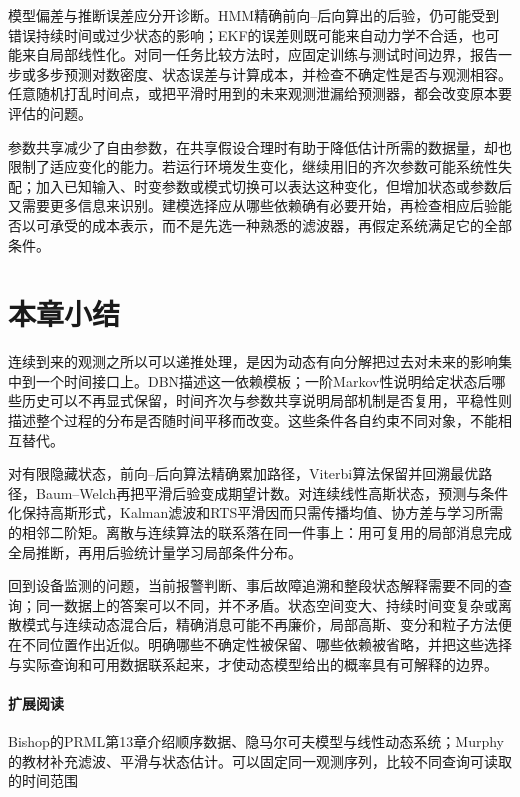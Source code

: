 模型偏差与推断误差应分开诊断。HMM精确前向--后向算出的后验，仍可能受到错误持续时间或过少状态的影响；EKF的误差则既可能来自动力学不合适，也可能来自局部线性化。对同一任务比较方法时，应固定训练与测试时间边界，报告一步或多步预测对数密度、状态误差与计算成本，并检查不确定性是否与观测相容。任意随机打乱时间点，或把平滑时用到的未来观测泄漏给预测器，都会改变原本要评估的问题。

参数共享减少了自由参数，在共享假设合理时有助于降低估计所需的数据量，却也限制了适应变化的能力。若运行环境发生变化，继续用旧的齐次参数可能系统性失配；加入已知输入、时变参数或模式切换可以表达这种变化，但增加状态或参数后又需要更多信息来识别。建模选择应从哪些依赖确有必要开始，再检查相应后验能否以可承受的成本表示，而不是先选一种熟悉的滤波器，再假定系统满足它的全部条件。

\section{本章小结}
\label{sec:pgm-dynamic-summary}

连续到来的观测之所以可以递推处理，是因为动态有向分解把过去对未来的影响集中到一个时间接口上。DBN描述这一依赖模板；一阶Markov性说明给定状态后哪些历史可以不再显式保留，时间齐次与参数共享说明局部机制是否复用，平稳性则描述整个过程的分布是否随时间平移而改变。这些条件各自约束不同对象，不能相互替代。

对有限隐藏状态，前向--后向算法精确累加路径，Viterbi算法保留并回溯最优路径，Baum--Welch再把平滑后验变成期望计数。对连续线性高斯状态，预测与条件化保持高斯形式，Kalman滤波和RTS平滑因而只需传播均值、协方差与学习所需的相邻二阶矩。离散与连续算法的联系落在同一件事上：用可复用的局部消息完成全局推断，再用后验统计量学习局部条件分布。

回到设备监测的问题，当前报警判断、事后故障追溯和整段状态解释需要不同的查询；同一数据上的答案可以不同，并不矛盾。状态空间变大、持续时间变复杂或离散模式与连续动态混合后，精确消息可能不再廉价，局部高斯、变分和粒子方法便在不同位置作出近似。明确哪些不确定性被保留、哪些依赖被省略，并把这些选择与实际查询和可用数据联系起来，才使动态模型给出的概率具有可解释的边界。

\paragraph{扩展阅读}
Bishop的PRML第13章介绍顺序数据、隐马尔可夫模型与线性动态系统；Murphy的教材补充滤波、平滑与状态估计。可以固定同一观测序列，比较不同查询可读取的时间范围
